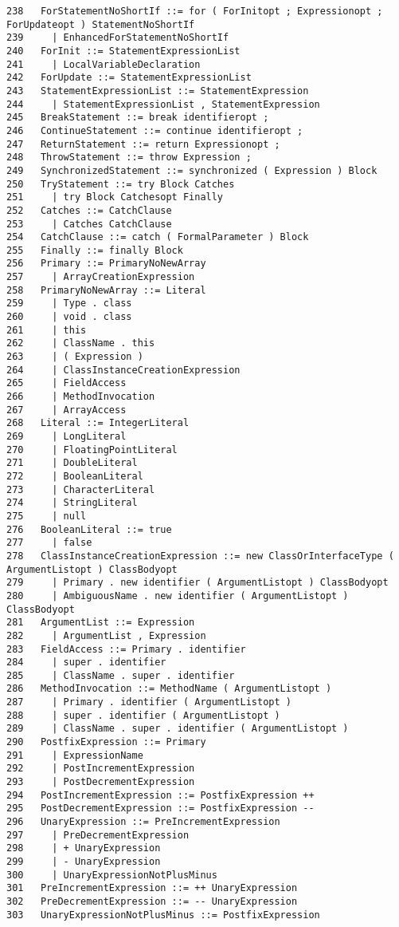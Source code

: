 {\begin{verbatim}
238   ForStatementNoShortIf ::= for ( ForInitopt ; Expressionopt ; ForUpdateopt ) StatementNoShortIf
239     | EnhancedForStatementNoShortIf
240   ForInit ::= StatementExpressionList
241     | LocalVariableDeclaration
242   ForUpdate ::= StatementExpressionList
243   StatementExpressionList ::= StatementExpression
244     | StatementExpressionList , StatementExpression
245   BreakStatement ::= break identifieropt ;
246   ContinueStatement ::= continue identifieropt ;
247   ReturnStatement ::= return Expressionopt ;
248   ThrowStatement ::= throw Expression ;
249   SynchronizedStatement ::= synchronized ( Expression ) Block
250   TryStatement ::= try Block Catches
251     | try Block Catchesopt Finally
252   Catches ::= CatchClause
253     | Catches CatchClause
254   CatchClause ::= catch ( FormalParameter ) Block
255   Finally ::= finally Block
256   Primary ::= PrimaryNoNewArray
257     | ArrayCreationExpression
258   PrimaryNoNewArray ::= Literal
259     | Type . class
260     | void . class
261     | this
262     | ClassName . this
263     | ( Expression )
264     | ClassInstanceCreationExpression
265     | FieldAccess
266     | MethodInvocation
267     | ArrayAccess
268   Literal ::= IntegerLiteral
269     | LongLiteral
270     | FloatingPointLiteral
271     | DoubleLiteral
272     | BooleanLiteral
273     | CharacterLiteral
274     | StringLiteral
275     | null
276   BooleanLiteral ::= true
277     | false
278   ClassInstanceCreationExpression ::= new ClassOrInterfaceType ( ArgumentListopt ) ClassBodyopt
279     | Primary . new identifier ( ArgumentListopt ) ClassBodyopt
280     | AmbiguousName . new identifier ( ArgumentListopt ) ClassBodyopt
281   ArgumentList ::= Expression
282     | ArgumentList , Expression
283   FieldAccess ::= Primary . identifier
284     | super . identifier
285     | ClassName . super . identifier
286   MethodInvocation ::= MethodName ( ArgumentListopt )
287     | Primary . identifier ( ArgumentListopt )
288     | super . identifier ( ArgumentListopt )
289     | ClassName . super . identifier ( ArgumentListopt )
290   PostfixExpression ::= Primary
291     | ExpressionName
292     | PostIncrementExpression
293     | PostDecrementExpression
294   PostIncrementExpression ::= PostfixExpression ++
295   PostDecrementExpression ::= PostfixExpression --
296   UnaryExpression ::= PreIncrementExpression
297     | PreDecrementExpression
298     | + UnaryExpression
299     | - UnaryExpression
300     | UnaryExpressionNotPlusMinus
301   PreIncrementExpression ::= ++ UnaryExpression
302   PreDecrementExpression ::= -- UnaryExpression
303   UnaryExpressionNotPlusMinus ::= PostfixExpression

\end{verbatim}}

